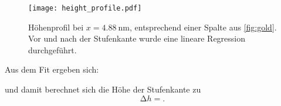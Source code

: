 \begin{figure}
  \centering
  \texttt{[image: height\_profile.pdf]}
  \caption{%
    Höhenprofil bei $x=\SI{4.88}{\nano\meter}$,
    entsprechend einer Spalte aus \autoref{fig:gold}.
    Vor und nach der Stufenkante wurde eine lineare Regression durchgeführt.}\label{fig:profile}
\end{figure}


Aus dem Fit ergeben sich:

und damit berechnet sich die Höhe der Stufenkante zu
\begin{equation}
  \increment h = .
\end{equation}
